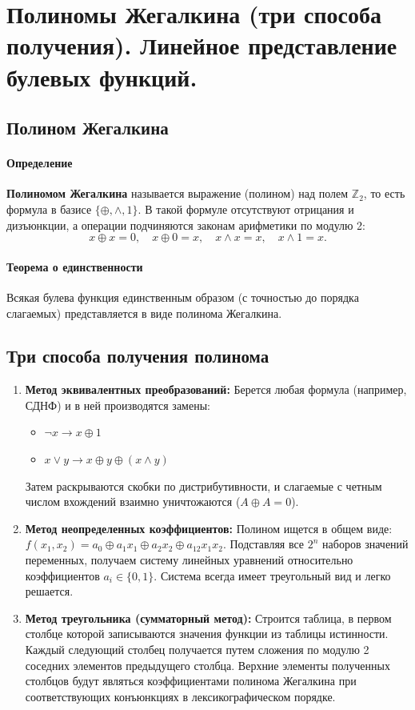 \section{Полиномы Жегалкина (три способа получения). Линейное представление булевых функций.}

\subsection*{Полином Жегалкина}

\paragraph{Определение}
\textbf{Полиномом Жегалкина} называется выражение (полином) над полем $\mathbb{Z}_2$, то есть формула в базисе $\{\oplus, \land, 1\}$. 
В такой формуле отсутствуют отрицания и дизъюнкции, а операции подчиняются законам арифметики по модулю 2:
$$x \oplus x = 0, \quad x \oplus 0 = x, \quad x \land x = x, \quad x \land 1 = x.$$

\paragraph{Теорема о единственности}
Всякая булева функция единственным образом (с точностью до порядка слагаемых) представляется в виде полинома Жегалкина.

\subsection*{Три способа получения полинома}

\begin{enumerate}
    \item \textbf{Метод эквивалентных преобразований:}
    Берется любая формула (например, СДНФ) и в ней производятся замены:
    \begin{itemize}
        \item $\neg x \to x \oplus 1$
        \item $x \lor y \to x \oplus y \oplus (x \land y)$
    \end{itemize}
    Затем раскрываются скобки по дистрибутивности, и слагаемые с четным числом вхождений взаимно уничтожаются ($A \oplus A = 0$).

    \item \textbf{Метод неопределенных коэффициентов:}
    Полином ищется в общем виде: $f(x_1, x_2) = a_0 \oplus a_1 x_1 \oplus a_2 x_2 \oplus a_{12} x_1 x_2$.
    Подставляя все $2^n$ наборов значений переменных, получаем систему линейных уравнений относительно коэффициентов $a_i \in \{0, 1\}$. Система всегда имеет треугольный вид и легко решается.

    \item \textbf{Метод треугольника (сумматорный метод):}
    Строится таблица, в первом столбце которой записываются значения функции из таблицы истинности. Каждый следующий столбец получается путем сложения по модулю 2 соседних элементов предыдущего столбца. Верхние элементы полученных столбцов будут являться коэффициентами полинома Жегалкина при соответствующих конъюнкциях в лексикографическом порядке.
\end{enumerate}

